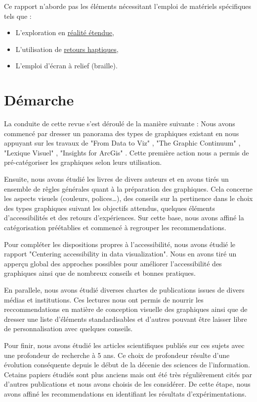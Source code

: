 \documentclass[a4paper,12pt]{article}
\begin{document}
\begin{multicols}{2}
Ce rapport n'aborde pas les éléments nécessitant l'emploi de matériels spécifiques tels que :
\begin{itemize}
\item L'exploration en \protect\hyperlink{gls-9}{\label{gls-9-use-1}réalité étendue},
\item L'utilisation de \protect\hyperlink{gls-10}{\label{gls-10-use-1}retours haptiques},
\item L'emploi d'écran à relief (braille).
\end{itemize}
\section{Démarche}
\label{sec:org547e38f}
La conduite de cette revue s'est déroulé de la manière suivante :
Nous avons commencé par dresser un panorama des types de graphiques existant en nous appuyant sur les travaux de "From Data to Viz" \autocite{yanholtzDataViz2018}, "The Graphic Continuum" \autocite{jonathanschwabishGraphicContinuum2014}, "Lexique Visuel" \autocite{alansmithLexiqueVisuel}, "Insights for ArcGis" \autocite{lindabealeInsightsArcGIS2017}.
Cette première action nous a permis de pré-catégoriser les graphiques selon leurs utilisation.

Ensuite, nous avons étudié les livres de divers auteurs et en avons tirés un ensemble de rêgles générales quant à la préparation des graphiques. Cela concerne les aspects visuels (couleurs, polices\ldots{}), des conseils sur la pertinence dans le choix des types graphiques suivant les objectifs attendus, quelques éléments d'accessibilités et des retours d'expériences. Sur cette base, nous avons affiné la catégorisation préétablies et commencé à regrouper les recommendations.

Pour compléter les dispositions propres à l'accessibilité, nous avons étudié le rapport "Centering accessibility in data visualization". \autocite{schwabishNotHarmGuide2022} Nous en avons tiré un apperçu global des approches possibles pour améliorer l'accessibilité des graphiques ainsi que de nombreux conseils et bonnes pratiques.

En parallele, nous avons étudié diverses chartes de publications issues de divers médias et institutions. Ces lectures nous ont permis de nourrir les reccommendations en matière de conception visuelle des graphiques ainsi que de dresser une liste d'éléments standardisables et d'autres pouvant être laisser libre de personnalisation avec quelques conseils.

Pour finir, nous avons étudié les articles scientifiques publiés sur ces sujets avec une profondeur de recherche à 5 ans. Ce choix de profondeur résulte d'une évolution conséquente depuis le début de la décenie des sciences de l'information. Cetains papiers étudiés sont plus anciens mais ont été très régulièrement cités par d'autres publications et nous avons choisis de les considérer. De cette étape, nous avons affiné les recommendations en identifiant les résultats d'expérimentations.

\end{multicols}
\end{document}
